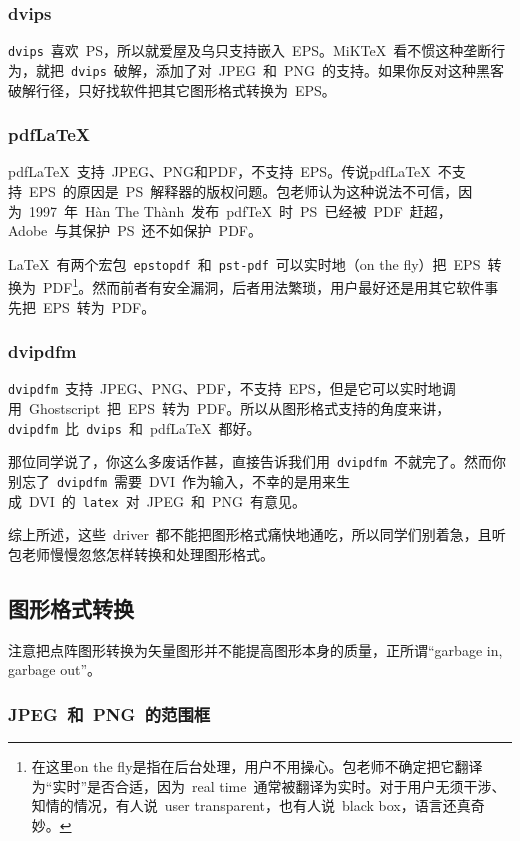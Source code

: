 \subsubsection{dvips}
\verb|dvips|~喜欢~PS，所以就爱屋及乌只支持嵌入~EPS。MiKTeX~看不惯这种垄断行为，就把~\verb|dvips|~破解，添加了对~JPEG~和~PNG~的支持。如果你反对这种黑客破解行径，只好找软件把其它图形格式转换为~EPS。

\subsubsection{pdf\LaTeX}
pdf\LaTeX~支持~JPEG、PNG和PDF，不支持~EPS。传说pdf\LaTeX~不支持~EPS~的原因是~PS~解释器的版权问题。包老师认为这种说法不可信，因为~1997~年~Hàn The Thành~发布~pdf\TeX~时~PS~已经被~PDF~赶超，Adobe~与其保护~PS~还不如保护~PDF。

\LaTeX~有两个宏包~\verb|epstopdf|~和~\verb|pst-pdf|~可以实时地（on the fly）把~EPS~转换为~PDF\footnote{在这里on the fly是指在后台处理，用户不用操心。包老师不确定把它翻译为“实时”是否合适，因为~real time~通常被翻译为实时。对于用户无须干涉、知情的情况，有人说~user transparent，也有人说~black box，语言还真奇妙。}。然而前者有安全漏洞，后者用法繁琐，用户最好还是用其它软件事先把~EPS~转为~PDF。

\subsubsection{dvipdfm}
\verb|dvipdfm|~支持~JPEG、PNG、PDF，不支持~EPS，但是它可以实时地调用~Ghostscript~把~EPS~转为~PDF。所以从图形格式支持的角度来讲，\verb|dvipdfm|~比~\verb|dvips|~和~pdf\LaTeX~都好。

那位同学说了，你这么多废话作甚，直接告诉我们用~\verb|dvipdfm|~不就完了。然而你别忘了~\verb|dvipdfm|~需要~DVI~作为输入，不幸的是用来生成~DVI~的~\verb|latex|~对~JPEG~和~PNG~有意见。

综上所述，这些~driver~都不能把图形格式痛快地通吃，所以同学们别着急，且听包老师慢慢忽悠怎样转换和处理图形格式。

\subsection{图形格式转换}

注意把点阵图形转换为矢量图形并不能提高图形本身的质量，正所谓“garbage in, garbage out”。

\subsubsection{JPEG~和~PNG~的范围框}

